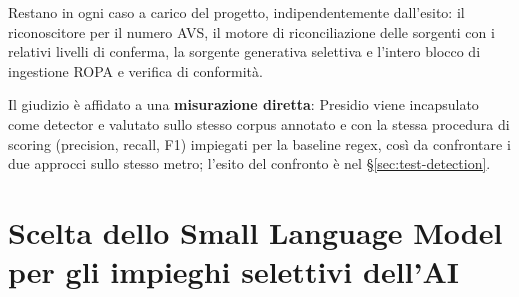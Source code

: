 Restano in ogni caso a carico del progetto, indipendentemente dall'esito: il riconoscitore per il numero AVS, il motore di riconciliazione delle sorgenti con i relativi livelli di conferma, la sorgente generativa selettiva e l'intero blocco di ingestione ROPA e verifica di conformità.

Il giudizio è affidato a una \textbf{misurazione diretta}: Presidio viene incapsulato come detector e valutato sullo stesso corpus annotato e con la stessa procedura di scoring (precision, recall, F1) impiegati per la baseline regex, così da confrontare i due approcci sullo stesso metro; l'esito del confronto è nel §\ref{sec:test-detection}.


\section{Scelta dello Small Language Model per gli impieghi selettivi dell'AI}
\label{sec:scelta-modello-llm}

